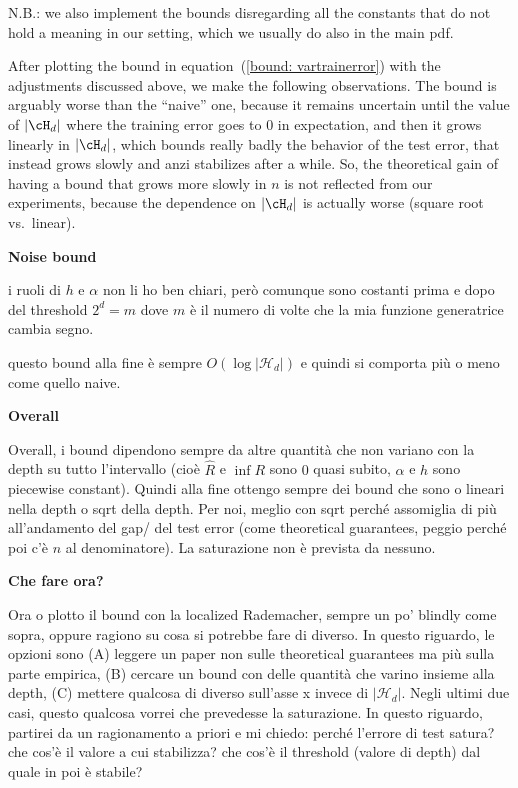 N.B.: we also implement the bounds disregarding all the constants that do not hold a meaning in our setting, which we usually do also in the main pdf. 

After plotting the bound in equation~(\ref{bound: vartrainerror}) with the adjustments discussed above, we make the following observations. The bound is arguably worse than the ``naive'' one, because it remains uncertain until the value of $\vert\cH_d\vert$ where the training error goes to 0 in expectation, and then it grows linearly in $\vert\cH_d\vert$, which bounds really badly the behavior of the test error, that instead grows slowly and anzi stabilizes after a while. So, the theoretical gain of having a bound that grows more slowly in $n$ is not reflected from our experiments, because the dependence on $\vert \cH_d\vert$ is actually worse (square root vs.\ linear). 

{\bf Noise bound}

i ruoli di $h$ e $\alpha$ non li ho ben chiari, però comunque sono costanti prima e dopo del threshold $2^d = m$ dove $m$ è il numero di volte che la mia funzione generatrice cambia segno. 

questo bound alla fine è sempre $O(\log \vert\mathcal H_d\vert)$ e quindi si comporta più o meno come quello naive. 

{\bf Overall}

Overall, i bound dipendono sempre da altre quantità che non variano con la depth su tutto l'intervallo (cioè $\hat R$ e $\inf R$ sono $0$ quasi subito, $\alpha$ e $h$ sono piecewise constant). Quindi alla fine ottengo sempre dei bound che sono o lineari nella depth o sqrt della depth. Per noi, meglio con sqrt perché assomiglia di più all'andamento del gap/ del test error (come theoretical guarantees, peggio perché poi c'è $n$ al denominatore). La saturazione non è prevista da nessuno. 

{\bf Che fare ora?}

Ora o plotto il bound con la localized Rademacher, sempre un po' blindly come sopra, oppure ragiono su cosa si potrebbe fare di diverso. In questo riguardo, le opzioni sono (A) leggere un paper non sulle theoretical guarantees ma più sulla parte empirica, (B) cercare un bound con delle quantità che varino insieme alla depth, (C) mettere qualcosa di diverso sull'asse x invece di $\vert \mathcal H_d \vert$. Negli ultimi due casi, questo qualcosa vorrei che prevedesse la saturazione. In questo riguardo, partirei da un ragionamento a priori e mi chiedo: perché l'errore di test satura? che cos'è il valore a cui stabilizza? che cos'è il threshold (valore di depth) dal quale in poi è stabile?

